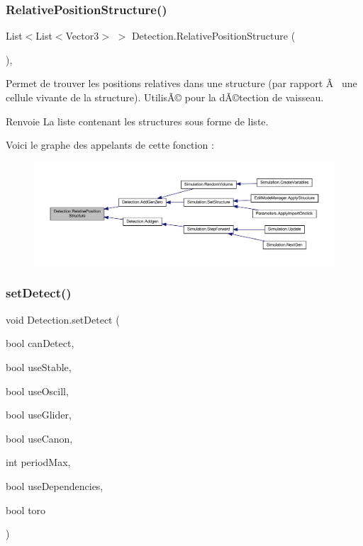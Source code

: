 \subsubsection{\texorpdfstring{Relative\+Position\+Structure()}{RelativePositionStructure()}}
{\footnotesize\ttfamily List$<$List$<$Vector3$>$ $>$ Detection.\+Relative\+Position\+Structure (\begin{DoxyParamCaption}{ }\end{DoxyParamCaption})\hspace{0.3cm}{\ttfamily [inline]}, {\ttfamily [private]}}



Permet de trouver les positions relatives dans une structure (par rapport Ã  une cellule vivante de la structure). UtilisÃ© pour la dÃ©tection de vaisseau. 

\begin{DoxyReturn}{Renvoie}
La liste contenant les structures sous forme de liste.
\end{DoxyReturn}
Voici le graphe des appelants de cette fonction \+:
\nopagebreak
\begin{figure}[H]
\begin{center}
\leavevmode
\includegraphics[width=350pt]{class_detection_a168b07e1ffdca2d91d8c5e251a470a25_icgraph}
\end{center}
\end{figure}
\mbox{\label{class_detection_a31fe39fdfc2f5b8c9e92bcfe1c5d6cc0}} 
\subsubsection{\texorpdfstring{set\+Detect()}{setDetect()}}
{\footnotesize\ttfamily void Detection.\+set\+Detect (\begin{DoxyParamCaption}\item[{bool}]{can\+Detect,  }\item[{bool}]{use\+Stable,  }\item[{bool}]{use\+Oscill,  }\item[{bool}]{use\+Glider,  }\item[{bool}]{use\+Canon,  }\item[{int}]{period\+Max,  }\item[{bool}]{use\+Dependencies,  }\item[{bool}]{toro }\end{DoxyParamCaption})\hspace{0.3cm}{\ttfamily [inline]}}



